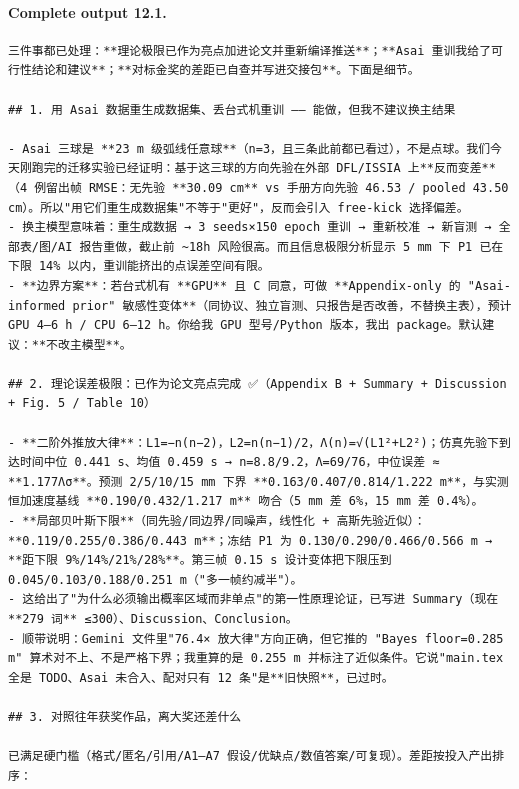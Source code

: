 \documentclass[UTF8,10pt]{ctexart}
\begin{document}
\paragraph{Complete output 12.1.}
\begin{Verbatim}[breaklines=true,breakanywhere=true,fontsize=\scriptsize,frame=single,framesep=2pt]
三件事都已处理：**理论极限已作为亮点加进论文并重新编译推送**；**Asai 重训我给了可行性结论和建议**；**对标金奖的差距已自查并写进交接包**。下面是细节。

## 1. 用 Asai 数据重生成数据集、丢台式机重训 —— 能做，但我不建议换主结果

- Asai 三球是 **23 m 级弧线任意球**（n=3，且三条此前都已看过），不是点球。我们今天刚跑完的迁移实验已经证明：基于这三球的方向先验在外部 DFL/ISSIA 上**反而变差**（4 例留出帧 RMSE：无先验 **30.09 cm** vs 手册方向先验 46.53 / pooled 43.50 cm）。所以"用它们重生成数据集"不等于"更好"，反而会引入 free-kick 选择偏差。
- 换主模型意味着：重生成数据 → 3 seeds×150 epoch 重训 → 重新校准 → 新盲测 → 全部表/图/AI 报告重做，截止前 ~18h 风险很高。而且信息极限分析显示 5 mm 下 P1 已在下限 14% 以内，重训能挤出的点误差空间有限。
- **边界方案**：若台式机有 **GPU** 且 C 同意，可做 **Appendix-only 的 "Asai-informed prior" 敏感性变体**（同协议、独立盲测、只报告是否改善，不替换主表），预计 GPU 4–6 h / CPU 6–12 h。你给我 GPU 型号/Python 版本，我出 package。默认建议：**不改主模型**。

## 2. 理论误差极限：已作为论文亮点完成 ✅（Appendix B + Summary + Discussion + Fig. 5 / Table 10）

- **二阶外推放大律**：L1=−n(n−2)，L2=n(n−1)/2，Λ(n)=√(L1²+L2²)；仿真先验下到达时间中位 0.441 s、均值 0.459 s → n=8.8/9.2，Λ=69/76，中位误差 ≈ **1.177Λσ**。预测 2/5/10/15 mm 下界 **0.163/0.407/0.814/1.222 m**，与实测恒加速度基线 **0.190/0.432/1.217 m** 吻合（5 mm 差 6%，15 mm 差 0.4%）。
- **局部贝叶斯下限**（同先验/同边界/同噪声，线性化 + 高斯先验近似）：**0.119/0.255/0.386/0.443 m**；冻结 P1 为 0.130/0.290/0.466/0.566 m → **距下限 9%/14%/21%/28%**。第三帧 0.15 s 设计变体把下限压到 0.045/0.103/0.188/0.251 m（"多一帧约减半"）。
- 这给出了"为什么必须输出概率区域而非单点"的第一性原理论证，已写进 Summary（现在 **279 词** ≤300）、Discussion、Conclusion。
- 顺带说明：Gemini 文件里"76.4× 放大律"方向正确，但它推的 "Bayes floor=0.285 m" 算术对不上、不是严格下界；我重算的是 0.255 m 并标注了近似条件。它说"main.tex 全是 TODO、Asai 未合入、配对只有 12 条"是**旧快照**，已过时。

## 3. 对照往年获奖作品，离大奖还差什么

已满足硬门槛（格式/匿名/引用/A1–A7 假设/优缺点/数值答案/可复现）。差距按投入产出排序：


\end{Verbatim}
\end{document}
